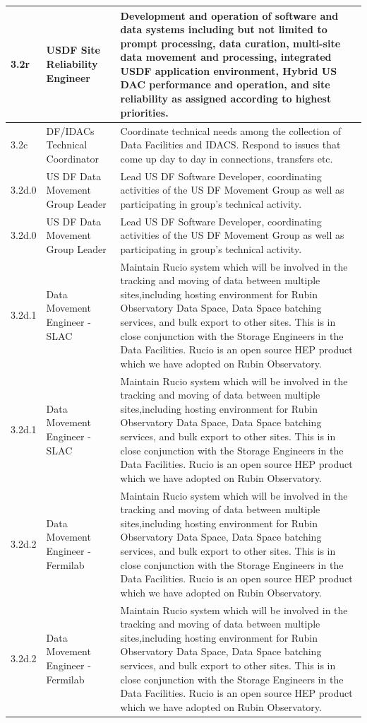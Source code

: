 \begin{longtable} {|p{}|p{}|p{}|}
{3.2r}&{USDF Site Reliability Engineer}&{Development and operation of software and data systems including but not limited to prompt processing, data curation, multi-site data movement and processing, integrated USDF application environment, Hybrid US DAC performance and operation, and site reliability as assigned according to highest priorities.} \\ \hline
{3.2c}&{DF/IDACs Technical Coordinator}&{Coordinate technical needs among the collection of Data Facilities and IDACS. Respond to issues that come up day to day in connections, transfers etc.} \\ \hline
{3.2d.0}&{US DF Data Movement Group Leader}&{Lead US DF Software Developer, coordinating activities of the US DF Movement Group as well as participating in group's technical activity.} \\ \hline
{3.2d.0}&{US DF Data Movement Group Leader}&{Lead US DF Software Developer, coordinating activities of the US DF Movement Group as well as participating in group's technical activity.} \\ \hline
{3.2d.1}&{Data Movement Engineer - SLAC}&{Maintain Rucio system which will be involved in the tracking and moving of data between multiple sites,including hosting environment for Rubin Observatory Data Space, Data Space batching services, and bulk export to other sites. This is in close conjunction with the Storage Engineers in the Data Facilities. Rucio is an open source HEP product which we have adopted on Rubin Observatory.} \\ \hline
{3.2d.1}&{Data Movement Engineer - SLAC}&{Maintain Rucio system which will be involved in the tracking and moving of data between multiple sites,including hosting environment for Rubin Observatory Data Space, Data Space batching services, and bulk export to other sites. This is in close conjunction with the Storage Engineers in the Data Facilities. Rucio is an open source HEP product which we have adopted on Rubin Observatory.} \\ \hline
{3.2d.2}&{Data Movement Engineer - Fermilab}&{Maintain Rucio system which will be involved in the tracking and moving of data between multiple sites,including hosting environment for Rubin Observatory Data Space, Data Space batching services, and bulk export to other sites. This is in close conjunction with the Storage Engineers in the Data Facilities. Rucio is an open source HEP product which we have adopted on Rubin Observatory.} \\ \hline
{3.2d.2}&{Data Movement Engineer - Fermilab}&{Maintain Rucio system which will be involved in the tracking and moving of data between multiple sites,including hosting environment for Rubin Observatory Data Space, Data Space batching services, and bulk export to other sites. This is in close conjunction with the Storage Engineers in the Data Facilities. Rucio is an open source HEP product which we have adopted on Rubin Observatory.} \\ \hline

\end{longtable}
